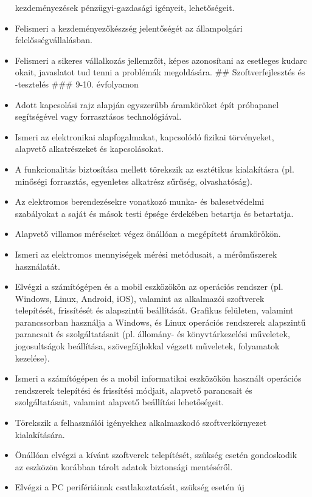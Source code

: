 \begin{itemize}
  kezdeményezések pénzügyi-gazdasági igényeit, lehetőségeit.
\item
  Felismeri a kezdeményezőkészség jelentőségét az állampolgári
  felelősségvállalásban.
\item
  Felismeri a sikeres vállalkozás jellemzőit, képes azonosítani az
  esetleges kudarc okait, javaslatot tud tenni a problémák megoldására.
  \#\# Szoftverfejlesztés és -tesztelés \#\#\# 9-10. évfolyamon
\item
  Adott kapcsolási rajz alapján egyszerűbb áramköröket épít próbapanel
  segítségével vagy forrasztásos technológiával.
\item
  Ismeri az elektronikai alapfogalmakat, kapcsolódó fizikai törvényeket,
  alapvető alkatrészeket és kapcsolásokat.
\item
  A funkcionalitás biztosítása mellett törekszik az esztétikus
  kialakításra (pl. minőségi forrasztás, egyenletes alkatrész sűrűség,
  olvashatóság).
\item
  Az elektromos berendezésekre vonatkozó munka- és balesetvédelmi
  szabályokat a saját és mások testi épsége érdekében betartja és
  betartatja.
\item
  Alapvető villamos méréseket végez önállóan a megépített áramkörökön.
\item
  Ismeri az elektromos mennyiségek mérési metódusait, a mérőműszerek
  használatát.
\item
  Elvégzi a számítógépen és a mobil eszközökön az operációs rendszer
  (pl. Windows, Linux, Android, iOS), valamint az alkalmazói szoftverek
  telepítését, frissítését és alapszintű beállítását. Grafikus
  felületen, valamint parancssorban használja a Windows, és Linux
  operációs rendszerek alapszintű parancsait és szolgáltatásait (pl.
  állomány- és könyvtárkezelési műveletek, jogosultságok beállítása,
  szövegfájlokkal végzett műveletek, folyamatok kezelése).
\item
  Ismeri a számítógépen és a mobil informatikai eszközökön használt
  operációs rendszerek telepítési és frissítési módjait, alapvető
  parancsait és szolgáltatásait, valamint alapvető beállítási
  lehetőségeit.
\item
  Törekszik a felhasználói igényekhez alkalmazkodó szoftverkörnyezet
  kialakítására.
\item
  Önállóan elvégzi a kívánt szoftverek telepítését, szükség esetén
  gondoskodik az eszközön korábban tárolt adatok biztonsági mentéséről.
\item
  Elvégzi a PC perifériáinak csatlakoztatását, szükség esetén új

\end{itemize}
